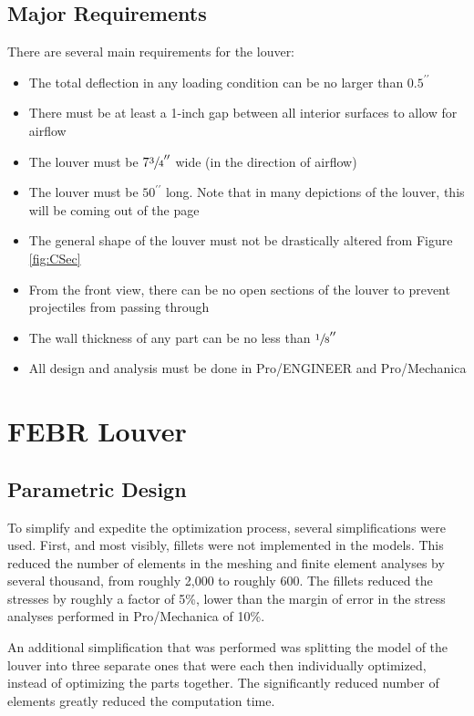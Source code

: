 \documentclass[12pt,letterpaper]{report}
\newcommand{\inchsign}{^{\prime\prime}} %
\begin{document}
		\newpage
		\section{Major Requirements}
		There are several main requirements for the louver:
		\begin{itemize}
			\item The total deflection in any loading condition can be no larger than $0.5\inchsign$
			\item There must be at least a 1-inch gap between all interior surfaces to allow for airflow
			\item The louver must be $7\sfrac{3}{4}\inchsign$ wide (in the direction of airflow)
			\item The louver must be $50\inchsign$ long.  Note that in many depictions of the louver, this will be coming out of the page
			\item The general shape of the louver must not be drastically altered from Figure \ref{fig:CSec}
			\item From the front view, there can be no open sections of the louver to prevent projectiles from passing through
			\item The wall thickness of any part can be no less than $\sfrac{1}{8}\inchsign$
			\item All design and analysis must be done in Pro/ENGINEER and Pro/Mechanica
		\end{itemize}
		
		
		\chapter{FEBR Louver}
		\vspace{-.25in}
		\section{Parametric Design}
		To simplify and expedite the optimization process, several simplifications were used.  First, and most visibly, fillets were not implemented in the models.  This reduced the number of elements in the meshing and finite element analyses by several thousand, from roughly 2,000 to roughly 600.  The fillets reduced the stresses by roughly a factor of 5\%, lower than the margin of error in the stress analyses performed in Pro/Mechanica of 10\%.
		
		An additional simplification that was performed was splitting the model of the louver into three separate ones that were each then individually optimized, instead of optimizing the parts together.  The significantly reduced number of elements greatly reduced the computation time.
		
\end{document}
